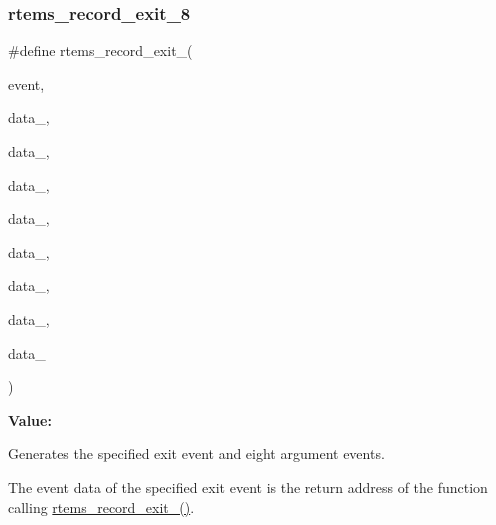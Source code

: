 \subsubsection{\texorpdfstring{rtems\_record\_exit\_8}{rtems\_record\_exit\_8}}
{\footnotesize\ttfamily \#define rtems\+\_\+record\+\_\+exit\+\_(\begin{DoxyParamCaption}\item[{}]{event,  }\item[{}]{data\+\_,  }\item[{}]{data\+\_,  }\item[{}]{data\+\_,  }\item[{}]{data\+\_,  }\item[{}]{data\+\_,  }\item[{}]{data\+\_,  }\item[{}]{data\+\_,  }\item[{}]{data\+\_ }\end{DoxyParamCaption})}

{\bfseries Value\+:}
\begin{DoxyCode}{0}
\DoxyCodeLine{  )}

\end{DoxyCode}


Generates the specified exit event and eight argument events. 

The event data of the specified exit event is the return address of the function calling \mbox{\hyperlink{group__RTEMSRecord_ga47a88394651dd48162a399b9bd2805c9}{rtems\+\_\+record\+\_\+exit\+\_()}}.


